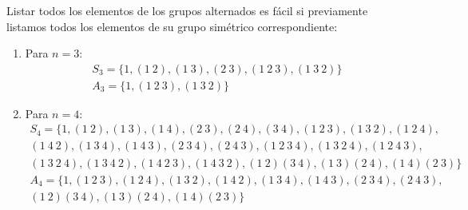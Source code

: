 \begin{ejemplo}
    Listar todos los elementos de los grupos alternados es fácil si previamente listamos todos los elementos de su grupo simétrico correspondiente:
    \begin{enumerate}
        \item Para $n=3$:
        \begin{gather*}
            S_3 = \{1, (1\ 2), (1\ 3), (2\ 3), (1\ 2\ 3), (1\ 3\ 2)\} \\
            A_3 = \{1, (1\ 2\ 3), (1\ 3\ 2)\}
        \end{gather*}
        \item Para $n=4$:
            \begin{multline*}
                S_4 = \{1, (1\ 2), (1\ 3), (1\ 4), (2\ 3), (2\ 4), (3\ 4), (1\ 2\ 3), (1\ 3\ 2), (1\ 2\ 4), \\
                    (1\ 4\ 2), (1\ 3\ 4), (1\ 4\ 3), (2\ 3\ 4), (2\ 4\ 3), (1\ 2\ 3\ 4), (1\ 3\ 2\ 4), (1\ 2\ 4\ 3), \\
                (1\ 3\ 2\ 4), (1\ 3\ 4\ 2), (1\ 4\ 2\ 3), (1\ 4\ 3\ 2), (1\ 2)(3\ 4), (1\ 3)(2\ 4), (1\ 4)(2\ 3)\}
            \end{multline*}
            \begin{multline*}
                A_4 = \{1, (1\ 2\ 3), (1\ 2\ 4), (1\ 3\ 2), (1\ 4\ 2), (1\ 3\ 4), (1\ 4\ 3), (2\ 3\ 4), (2\ 4\ 3), \\
                (1\ 2)(3\ 4), (1\ 3)(2\ 4), (1\ 4)(2\ 3)\}
            \end{multline*}
    \end{enumerate}
\end{ejemplo}


